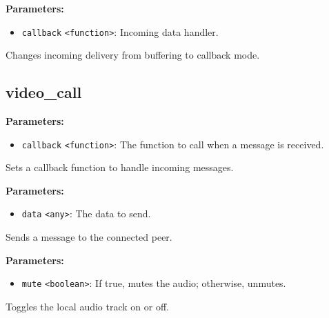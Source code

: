 \documentclass[12pt,a4paper]{article}
\begin{document}
\noindent \textbf{Parameters:}
\begin{itemize}
  \item \texttt{callback} \texttt{<function>}: Incoming data handler.
\end{itemize}

\noindent Changes incoming delivery from buffering to callback mode.


\subsection{video\_call}
\vspace{5mm}
\noindent {}


\noindent \textbf{Parameters:}
\begin{itemize}
  \item \texttt{callback} \texttt{<function>}: The function to call when a message is received.
\end{itemize}

\noindent Sets a callback function to handle incoming messages.

\vspace{5mm}
\noindent {}


\noindent \textbf{Parameters:}
\begin{itemize}
  \item \texttt{data} \texttt{<any>}: The data to send.
\end{itemize}

\noindent Sends a message to the connected peer.

\vspace{5mm}
\noindent {}


\noindent \textbf{Parameters:}
\begin{itemize}
  \item \texttt{mute} \texttt{<boolean>}: If true, mutes the audio; otherwise, unmutes.
\end{itemize}

\noindent Toggles the local audio track on or off.
\end{document}
